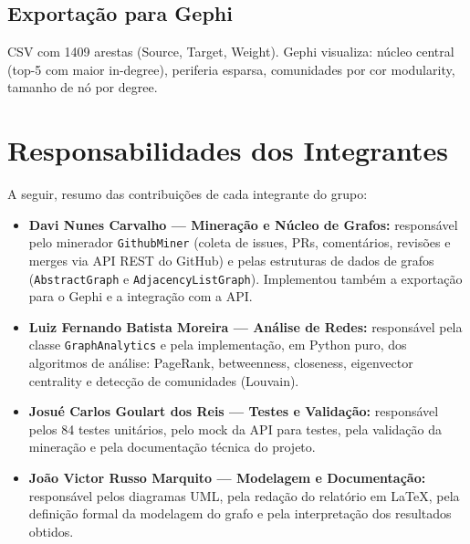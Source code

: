 \documentclass[12pt]{article}
\begin{document}
\subsection{Exportação para Gephi}

CSV com 1409 arestas (Source, Target, Weight). Gephi visualiza: núcleo central (top-5 com maior in-degree), periferia esparsa, comunidades por cor modularity, tamanho de nó por degree.

\section{Responsabilidades dos Integrantes}\label{sec:responsabilidades}

A seguir, resumo das contribuições de cada integrante do grupo:

\begin{itemize}
  \item \textbf{Davi Nunes Carvalho --- Mineração e Núcleo de Grafos:} responsável pelo minerador \texttt{GithubMiner} (coleta de issues, PRs, comentários, revisões e merges via API REST do GitHub) e pelas estruturas de dados de grafos (\texttt{AbstractGraph} e \texttt{AdjacencyListGraph}). Implementou também a exportação para o Gephi e a integração com a API.

  \item \textbf{Luiz Fernando Batista Moreira --- Análise de Redes:} responsável pela classe \texttt{GraphAnalytics} e pela implementação, em Python puro, dos algoritmos de análise: PageRank, betweenness, closeness, eigenvector centrality e detecção de comunidades (Louvain).

  \item \textbf{Josué Carlos Goulart dos Reis --- Testes e Validação:} responsável pelos 84 testes unitários, pelo mock da API para testes, pela validação da mineração e pela documentação técnica do projeto.

  \item \textbf{João Victor Russo Marquito --- Modelagem e Documentação:} responsável pelos diagramas UML, pela redação do relatório em \LaTeX{}, pela definição formal da modelagem do grafo e pela interpretação dos resultados obtidos.
\end{itemize}

\end{document}
